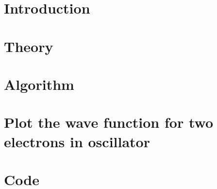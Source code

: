 \documentclass[a4paper,english]{article}
\author{Kristoffer Brækken, Vedad Hodzic, Paul Magnus
Sørensen-Clark}
\begin{document}
\begin{titlepage}
    \thispagestyle{empty}
    
\end{titlepage}

\section{Introduction}


\section{Theory}


\section{Algorithm}


\section{Plot the wave function for two electrons in oscillator}




\section{Code}

\end{document}
